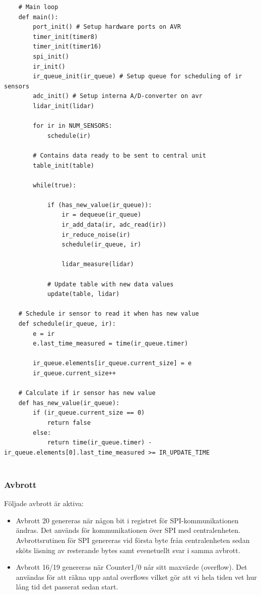 \documentclass[a4paper,titlepage,12pt]{article}
\begin{document}
    \begin{lstlisting}
    # Main loop
	def main():
        port_init() # Setup hardware ports on AVR
        timer_init(timer8)
        timer_init(timer16)
        spi_init()
        ir_init()
        ir_queue_init(ir_queue) # Setup queue for scheduling of ir sensors
        adc_init() # Setup interna A/D-converter on avr
        lidar_init(lidar)
        
        for ir in NUM_SENSORS:
            schedule(ir)
        
        # Contains data ready to be sent to central unit
        table_init(table)
        
        while(true):

            if (has_new_value(ir_queue)):
                ir = dequeue(ir_queue)
                ir_add_data(ir, adc_read(ir))
                ir_reduce_noise(ir)
                schedule(ir_queue, ir)
        		
                lidar_measure(lidar)
        	
            # Update table with new data values
            update(table, lidar)
        
    # Schedule ir sensor to read it when has new value
    def schedule(ir_queue, ir):
        e = ir
        e.last_time_measured = time(ir_queue.timer)

        ir_queue.elements[ir_queue.current_size] = e
        ir_queue.current_size++
	    
	# Calculate if ir sensor has new value
	def has_new_value(ir_queue):
        if (ir_queue.current_size == 0) 
            return false
        else:
            return time(ir_queue.timer) - ir_queue.elements[0].last_time_measured >= IR_UPDATE_TIME
	    
    \end{lstlisting}

    \subsubsection{Avbrott}
	Följade avbrott är aktiva:
    \begin{itemize}
        \item Avbrott 20 genereras när någon bit i registret för SPI-kommunikationen
        ändras. Det används för kommunikationen över SPI med centralenheten. 
        Avbrottsrutinen för SPI genereras vid första byte från centralenheten 
        sedan sköts läsning av resterande bytes samt evenetuellt svar i samma 
        avbrott. 
		\item Avbrott 16/19 genereras när Counter1/0 når sitt maxvärde (overflow). 
		Det användas för att räkna upp antal overflows vilket gör att vi hela tiden 
		vet hur lång tid det passerat sedan start. 
    \end{itemize}
	
\end{document}
